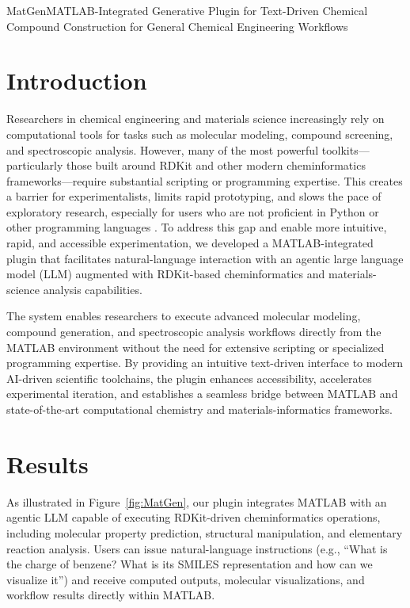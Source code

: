\begin{teamsubmission}{MatGen}{MATLAB-Integrated Generative Plugin for Text-Driven Chemical Compound Construction for General Chemical Engineering Workflows}
\section*{Introduction}
Researchers in chemical engineering and materials science increasingly rely on computational tools for tasks such as molecular modeling, compound screening, and spectroscopic analysis. However, many of the most powerful toolkits—particularly those built around RDKit and other modern cheminformatics frameworks—require substantial scripting or programming expertise. This creates a barrier for experimentalists, limits rapid prototyping, and slows the pace of exploratory research, especially for users who are not proficient in Python or other programming languages \cite{BradBarrier}. To address this gap and enable more intuitive, rapid, and accessible experimentation, we developed a MATLAB-integrated plugin that facilitates natural-language interaction with an agentic large language model (LLM) augmented with RDKit-based cheminformatics and materials-science analysis capabilities.

The system enables researchers to execute advanced molecular modeling, compound generation, and spectroscopic analysis workflows directly from the MATLAB environment without the need for extensive scripting or specialized programming expertise. By providing an intuitive text-driven interface to modern AI-driven scientific toolchains, the plugin enhances accessibility, accelerates experimental iteration, and establishes a seamless bridge between MATLAB and state-of-the-art computational chemistry and materials-informatics frameworks.

\section*{Results}
As illustrated in Figure~\ref{fig:MatGen}, our plugin integrates MATLAB with an agentic LLM capable of executing RDKit-driven cheminformatics operations, including molecular property prediction, structural manipulation, and elementary reaction analysis. Users can issue natural-language instructions (e.g., “What is the charge of benzene? What is its SMILES representation and how can we visualize it”) and receive computed outputs, molecular visualizations, and workflow results directly within MATLAB.


\end{teamsubmission}
